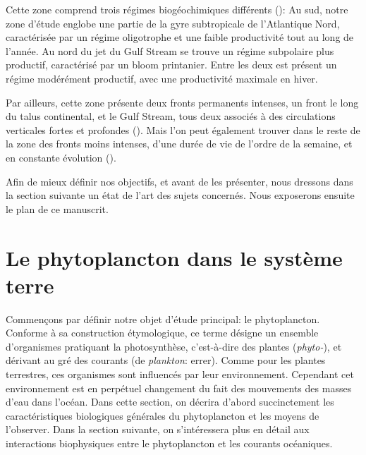 Cette zone comprend trois régimes biogéochimiques différents (\cite{bock_2022}):
Au sud, notre zone d'étude englobe une partie de la gyre subtropicale de l'Atlantique Nord, caractérisée par un régime oligotrophe et une faible productivité tout au long de l'année.
Au nord du jet du Gulf Stream se trouve un régime subpolaire plus productif, caractérisé par un bloom printanier.
Entre les deux est présent un régime modérément productif, avec une productivité maximale en hiver.

Par ailleurs, cette zone présente deux fronts permanents intenses, un front le long du talus continental, et le Gulf Stream, tous deux associés à des circulations verticales fortes et profondes (\cite{flagg_2006,liao_2022}).
Mais l'on peut également trouver dans le reste de la zone des fronts moins intenses, d'une durée de vie de l'ordre de la semaine, et en constante évolution (\cite{drushka_2019,sanchez-rios_2020}).

Afin de mieux définir nos objectifs, et avant de les présenter, nous dressons dans la section suivante un état de l'art des sujets concernés.
Nous exposerons ensuite le plan de ce manuscrit.

\section{Le phytoplancton dans le système terre}
\label{sec:phyto-ds-sys-terre}


Commençons par définir notre objet d'étude principal: le phytoplancton.
Conforme à sa construction étymologique, ce terme désigne un ensemble d'organismes pratiquant la photosynthèse, c'est-à-dire des plantes (\emph{phyto-}), et dérivant au gré des courants (de \emph{plankton}: errer).
Comme pour les plantes terrestres, ces organismes sont influencés par leur environnement.
Cependant cet environnement est en perpétuel changement du fait des mouvements des masses d'eau dans l'océan.
Dans cette section, on décrira d'abord succinctement les caractéristiques biologiques générales du phytoplancton et les moyens de l'observer.
Dans la section suivante, on s'intéressera plus en détail aux interactions biophysiques entre le phytoplancton et les courants océaniques.

